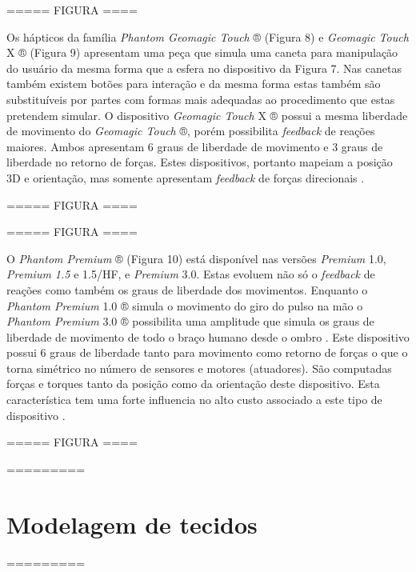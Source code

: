 ===== FIGURA ====

Os hápticos da família \textit{Phantom Geomagic Touch} ® (Figura 8) e \textit{Geomagic Touch} X ® (Figura 9) apresentam uma peça que simula uma caneta para manipulação do usuário da mesma forma que a esfera no dispositivo da Figura 7. Nas canetas também existem botões para interação e da mesma forma estas também são substituíveis por partes com formas mais adequadas ao procedimento que estas pretendem simular. O dispositivo \textit{Geomagic Touch} X ® possui a mesma liberdade de movimento do \textit{Geomagic Touch} ®, porém possibilita \textit{feedback} de reações maiores. Ambos apresentam 6 graus de liberdade de movimento e 3 graus de liberdade no retorno de forças. Estes dispositivos, portanto mapeiam a posição 3D e orientação, mas somente apresentam \textit{feedback} de forças direcionais \cite{Forsslund2013}.

===== FIGURA ====

===== FIGURA ====

O \textit{Phantom Premium} ® (Figura 10) está disponível nas versões \textit{Premium} 1.0, \textit{Premium 1.5} e 1.5/HF, e \textit{Premium} 3.0. Estas evoluem não só o \textit{feedback} de reações como também os graus de liberdade dos movimentos. Enquanto o \textit{Phantom Premium} 1.0 ® simula o movimento do giro do pulso na mão o \textit{Phantom Premium} 3.0 ® possibilita uma amplitude que simula os graus de liberdade de movimento de todo o braço humano desde o ombro \cite{3DSystems2018}. Este dispositivo possui 6 graus de liberdade tanto para movimento como retorno de forças o que o torna simétrico no número de sensores e motores (atuadores). São computadas forças e torques tanto da posição como da orientação deste dispositivo. Esta característica tem uma forte influencia no alto custo associado a este tipo de dispositivo \cite{Forsslund2013}.

===== FIGURA ====

=========

\section{Modelagem de tecidos}

=========


